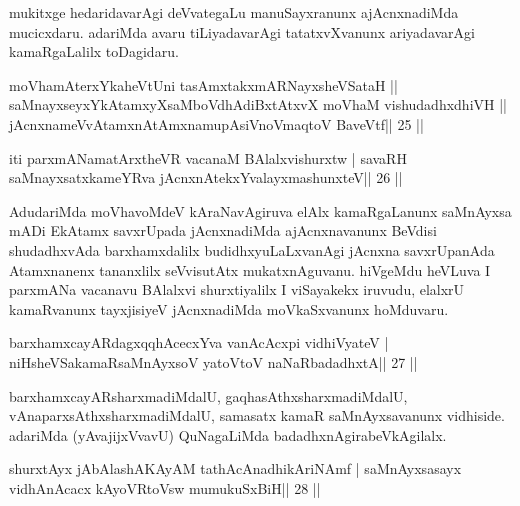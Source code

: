 \begin{artha}
mukitxge hedaridavarAgi deVvategaLu manuSayxranunx ajAcnxnadiMda mucicxdaru. adariMda avaru tiLiyadavarAgi tatatxvXvanunx ariyadavarAgi kamaRgaLalilx toDagidaru.
\end{artha}

\begin{shl}
moVhamAterxYkaheVtUni tasAmxtakxmARNayxsheVSataH ||
saMnayxseyxYkAtamxyXsaMboVdhAdiBxtAtxvX moVhaM vishudadhxdhiVH ||
jAcnxnameVvA\s\s tamxnA\s\s tAmxnamupAsiVnoV\s maqtoV BaveVtf\hfill || 25 ||
\end{shl}

\begin{shl}
iti parxmANamatArxtheVR vacanaM BAlalxvishurxtw |
savaRH saMnayxsatxkameYRva jAcnxnAtekxYvalayxmashunxteV\hfill || 26 ||
\end{shl}

\begin{artha}
AdudariMda moVhavoMdeV kAraNavAgiruva elAlx kamaRgaLanunx saMnAyxsa mADi EkAtamx savxrUpada jAcnxnadiMda ajAcnxnavanunx BeVdisi shudadhxvAda barxhamxdalilx budidhxyuLaLxvanAgi jAcnxna savxrUpanAda Atamxnanenx tananxlilx seVvisutAtx mukatxnAguvanu. hiVgeMdu heVLuva I parxmANa vacanavu BAlalxvi shurxtiyalilx I viSayakekx iruvudu, elalxrU kamaRvanunx tayxjisiyeV jAcnxnadiMda moVkaSxvanunx hoMduvaru.
\end{artha}


\begin{shl}
barxhamxcayARdagxqqhAcecxYva vanAcAcxpi vidhiVyateV |
niHsheVSakamaRsaMnAyxsoV yatoV\s toV naNaRbadadhxtA\hfill || 27 ||
\end{shl}

\begin{artha}
barxhamxcayARsharxmadiMdalU, gaqhasAthxsharxmadiMdalU,  vAnaparxsAthxsharxmadiMdalU, samasatx kamaR saMnAyxsavanunx vidhiside. adariMda (yAvajijxVvavU) QuNagaLiMda badadhxnAgirabeVkAgilalx.
\end{artha}

\begin{shl}
\footnotemark[1]shurxtAyx jAbAlashAKAyAM tathAcAnadhikAriNAmf |
saMnAyxsasayx vidhAnAcacx kAyoVR\s toV\s sw mumukuSxBiH\hfill || 28 ||
\end{shl}

